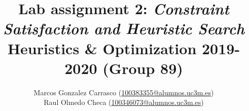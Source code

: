 \documentclass[a4paper,usenames,dvipsnames,table]{report}
\begin{document}
\title{
    {\Huge \textbf{Lab assignment 2: \textit{Constraint Satisfaction and Heuristic Search}\\}}
    {\small Heuristics \& Optimization 2019-2020 (Group 89)}
}
\author{
    Marcos Gonzalez Carrasco ({\normalsize \href{mailto:100383355@alumnos.uc3m.es}{100383355@alumnos.uc3m.es}})\\
    Raul Olmedo Checa ({\normalsize \href{mailto:100346073@alumnos.uc3m.es}{100346073@alumnos.uc3m.es}})\\
}
\maketitle




\tableofcontents









\newpage
\end{document}
